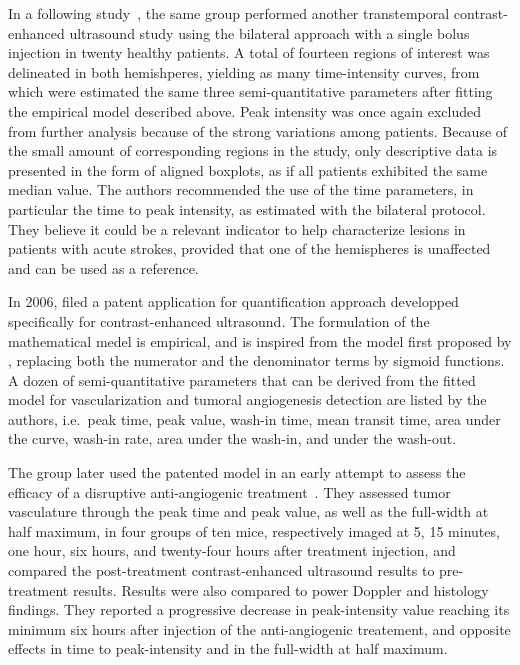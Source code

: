 In a following study~\cite{Krogias:2005hs}, the same group performed another transtemporal contrast-enhanced ultrasound study using the bilateral approach with a single bolus injection in twenty healthy patients.
A total of fourteen regions of interest was delineated in both hemishperes, yielding as many time-intensity curves, from which were estimated the same three semi-quantitative parameters after fitting the empirical model described above. 
Peak intensity was once again excluded from further analysis because of the strong variations among patients.
Because of the small amount of corresponding regions in the study, only descriptive data is presented in the form of aligned boxplots, as if all patients exhibited the same median value. 
The authors recommended the use of the time parameters, in particular the time to peak intensity, as estimated with the bilateral protocol.
They believe it could be a relevant indicator to help characterize lesions in patients with acute strokes, provided that one of the hemispheres is unaffected and can be used as a reference.

In 2006, \citet{Elie2014} filed a patent application for quantification approach developped specifically for contrast-enhanced ultrasound.
The formulation of the mathematical medel is empirical, and is inspired from the model first proposed by \citet{Eyding:2003bo}, replacing both the numerator and the denominator terms by sigmoid functions. 
A dozen of semi-quantitative parameters that can be derived from the fitted model for vascularization and tumoral angiogenesis detection are listed by the authors, i.e.~peak time, peak value, wash-in time, mean transit time, area under the curve, wash-in rate, area under the wash-in, and under the wash-out. 

The group later used the patented model in an early attempt to assess the efficacy of a disruptive anti-angiogenic treatment~\cite{Lavisse:2008gc}.
They assessed tumor vasculature through the peak time and peak value, as well as the full-width at half maximum, in four groups of ten mice, respectively imaged at 5, 15 minutes, one hour, six hours, and twenty-four hours after treatment injection, and compared the post-treatment contrast-enhanced ultrasound results to pre-treatment results.
Results were also compared to power Doppler and histology findings.
They reported a progressive decrease in peak-intensity value reaching its minimum six hours after injection of the anti-angiogenic treatement, and opposite effects in time to peak-intensity and in the full-width at half maximum.

